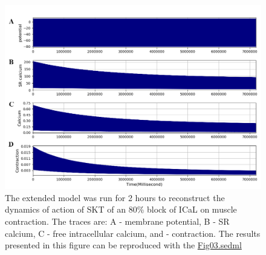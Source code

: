 \documentclass[fleqn,10pt]{physiome}
\begin{document}
\begin{figure}[h!]
\centering
\includegraphics[width=0.9\linewidth]{figure03}
\caption{The extended model was run for 2 hours to reconstruct the dynamics of action of SKT of an 80\% block of ICaL on muscle contraction. 
The traces are: A - membrane potential, B - SR calcium, C - free intracellular calcium, and - contraction. The results presented in this figure can be reproduced with the \href{https://models.physiomeproject.org/workspace/5f4/file/26289d9227fbf4f66ca8106d8bf80ff9a51a5ac6/Fig03.sedml}{Fig03.sedml}}
\label{fig03}
\end{figure}
\end{document}
